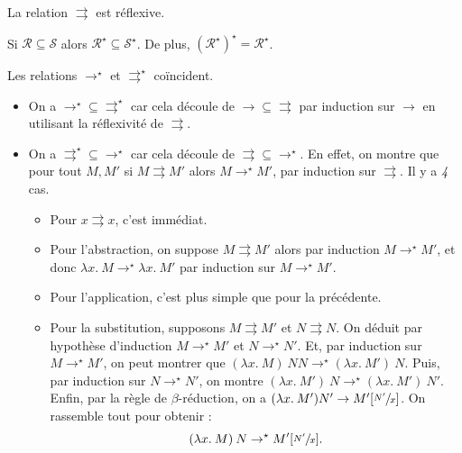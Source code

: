 \documentclass{../notes}
\let\rpar\rightrightarrows
\begin{document}
  \begin{lem}
    La relation $\rpar$ est réflexive.
  \end{lem}

  \begin{lem}
    Si $\mathcal{R} \subseteq \mathcal{S}$ alors $\mathcal{R}^\star \subseteq \mathcal{S}^\star$.
    De plus, $(\mathcal{R}^\star)^\star = \mathcal{R}^\star$.
  \end{lem}

  \begin{lem}
    Les relations $\to^\star$ et $\rpar^\star$ coïncident.
  \end{lem}
  \begin{prv}
    \begin{itemize}
      \item On a ${\to^\star} \subseteq {\rpar^\star}$ car cela découle de ${\to} \subseteq {\rpar}$ par induction sur $\to$ en utilisant la réflexivité de $\rpar$.
      \item On a ${\rpar^\star} \subseteq {\to^\star}$ car cela découle de ${\rpar} \subseteq {\to^\star}$.
        En effet, on montre que pour tout $M, M'$ si $M \rpar M'$ alors $M \to^\star M'$, par induction sur $\rpar$. Il y a  \textit{4} cas.
        \begin{itemize}
          \item Pour $x \rpar x$, c'est immédiat. 
          \item Pour l'abstraction, on suppose $M \rpar M'$ alors par induction  $M \to^\star M'$, et donc $\lambda x.\: M \to^\star \lambda x.\: M'$ par induction sur $M \to^\star M'$.
          \item Pour l'application, c'est plus simple que pour la précédente.
          \item Pour la substitution, supposons $M \rpar M'$ et $N \rpar N$.
            On déduit par hypothèse d'induction $M \to^\star M'$ et $N \to^\star N'$.
            Et, par induction sur $M \to^\star M'$, on peut montrer que $(\lambda x.\: M)\: N N \to^\star (\lambda x.\: M') \: N$.
            Puis, par induction sur $N \to^\star N'$, on montre $(\lambda x.\: M') \: N \to^\star (\lambda x.\: M') \: N'$.
            Enfin, par la règle de $\beta$-réduction, on a $(\lambda x.\: M') N' \to M'[\sfrac{N'}{x}]$.
            On rassemble tout pour obtenir :
            \[
              (\lambda x.\: M) \: N \to^\star M'[\sfrac{N'}{x}]
            .\] 
        \end{itemize}
    \end{itemize}
  \end{prv}
\end{document}
